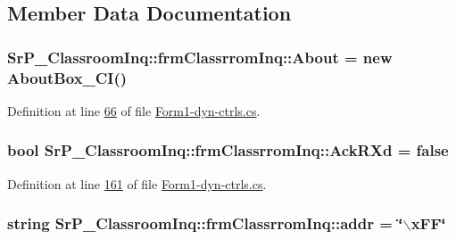 \subsection{\-Member \-Data \-Documentation}
\hypertarget{class_sr_p___classroom_inq_1_1frm_classrrom_inq_aa797137da7c6757a4fc98c07d41928db}{
\subsubsection[{\-About}]{ {\bf \-Sr\-P\-\_\-\-Classroom\-Inq\-::frm\-Classrrom\-Inq\-::\-About} = new {\bf \-About\-Box\-\_\-\-C\-I}()}}
\label{class_sr_p___classroom_inq_1_1frm_classrrom_inq_aa797137da7c6757a4fc98c07d41928db}


\-Definition at line \hyperlink{_form1-dyn-ctrls_8cs_source_l00066}{66} of file \hyperlink{_form1-dyn-ctrls_8cs_source}{\-Form1-\/dyn-\/ctrls.\-cs}.

\hypertarget{class_sr_p___classroom_inq_1_1frm_classrrom_inq_a65b6633a5bc7bff8142fcace6bfba3f8}{
\subsubsection[{\-Ack\-R\-Xd}]{\setlength{\rightskip}{0pt plus 5cm}bool {\bf \-Sr\-P\-\_\-\-Classroom\-Inq\-::frm\-Classrrom\-Inq\-::\-Ack\-R\-Xd} = false}}
\label{class_sr_p___classroom_inq_1_1frm_classrrom_inq_a65b6633a5bc7bff8142fcace6bfba3f8}


\-Definition at line \hyperlink{_form1-dyn-ctrls_8cs_source_l00161}{161} of file \hyperlink{_form1-dyn-ctrls_8cs_source}{\-Form1-\/dyn-\/ctrls.\-cs}.

\hypertarget{class_sr_p___classroom_inq_1_1frm_classrrom_inq_ab99245163109493292f36ab5011c4f76}{
\subsubsection[{addr}]{\setlength{\rightskip}{0pt plus 5cm}string {\bf \-Sr\-P\-\_\-\-Classroom\-Inq\-::frm\-Classrrom\-Inq\-::addr} = \char`\"{}$\backslash$x\-F\-F\char`\"{}}}
\label{class_sr_p___classroom_inq_1_1frm_classrrom_inq_ab99245163109493292f36ab5011c4f76}



